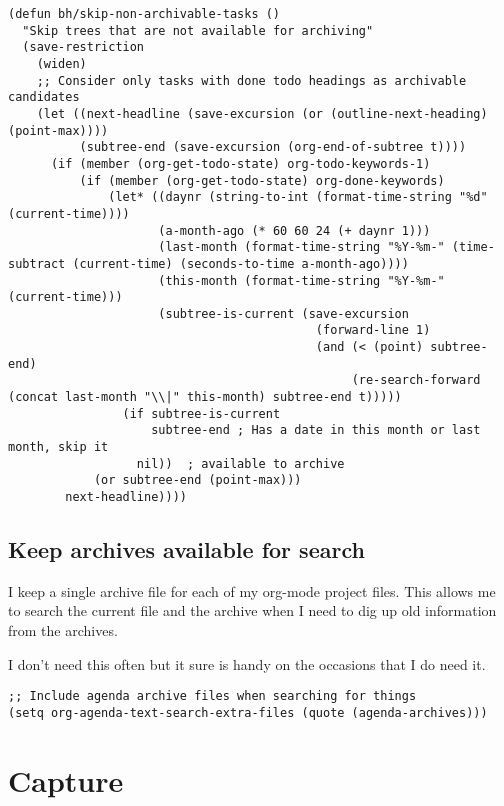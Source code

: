 \documentclass[11pt]{scrartcl}
\begin{document}
\begin{verbatim}
(defun bh/skip-non-archivable-tasks ()
  "Skip trees that are not available for archiving"
  (save-restriction
    (widen)
    ;; Consider only tasks with done todo headings as archivable candidates
    (let ((next-headline (save-excursion (or (outline-next-heading) (point-max))))
          (subtree-end (save-excursion (org-end-of-subtree t))))
      (if (member (org-get-todo-state) org-todo-keywords-1)
          (if (member (org-get-todo-state) org-done-keywords)
              (let* ((daynr (string-to-int (format-time-string "%d" (current-time))))
                     (a-month-ago (* 60 60 24 (+ daynr 1)))
                     (last-month (format-time-string "%Y-%m-" (time-subtract (current-time) (seconds-to-time a-month-ago))))
                     (this-month (format-time-string "%Y-%m-" (current-time)))
                     (subtree-is-current (save-excursion
                                           (forward-line 1)
                                           (and (< (point) subtree-end)
                                                (re-search-forward (concat last-month "\\|" this-month) subtree-end t)))))
                (if subtree-is-current
                    subtree-end ; Has a date in this month or last month, skip it
                  nil))  ; available to archive
            (or subtree-end (point-max)))
        next-headline))))
\end{verbatim}

\subsection{Keep archives available for search}
\label{sec:orgheadline17}

I keep a single archive file for each of my org-mode project files.
This allows me to search the current file and the archive when I need
to dig up old information from the archives.

I don't need this often but it sure is handy on the occasions that
I do need it.

\begin{verbatim}
;; Include agenda archive files when searching for things
(setq org-agenda-text-search-extra-files (quote (agenda-archives)))
\end{verbatim}
\section{Capture}
\label{sec:orgheadline21}
\end{document}

